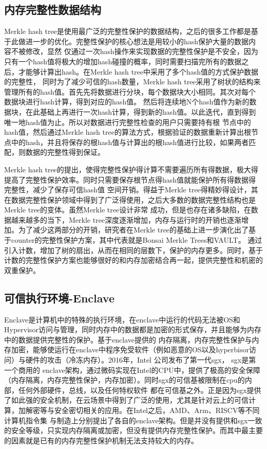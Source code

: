 \subsection{内存完整性数据结构}
Merkle hash tree是使用最广泛的完整性保护的数据结构，之后的很多工作都是基于此做进一步的优化。完整性保护的核心想法是用较小的hash保护大量的数据内容不被修改，显然
仅通过一次hash操作来实现数据的完整性保护是不安全，因为只有一个hash值将极大的增加hash碰撞的概率，同时需要扫描完所有的数据之后，才能够计算出hash。在Merkle hash tree中采用了多个hash值的方式保护数据的完整性，
同时为了减少可信的hash数量，Merkle hash tree采用了树状的结构来管理所有的hash值。首先先将数据进行分块，每个数据块大小相同。其次对每个数据块进行hash计算，得到对应的hash值。
然后将连续地N个hash值作为新的数据块，在此基础上再进行一次hash计算，得到新的hash值。以此迭代，直到得到唯一地hash值为止。所以对数据进行完整性检查的用户只需要持有根
节点中的hash值，然后通过Merkle hash tree的算法方式，根据验证的数据重新计算出根节点中的hash，并且将保存的根hash值与计算出的根hash值进行比较，如果两者匹配，则数据的完整性得到保证。

Merkle hash tree的提出，使得完整性保护得计算不需要遍历所有得数据，极大得提高了完整性保护效率。同时只需要保存根节点得hash值就能保护所有得数据得完整性，减少了保存可信hash值
空间开销。得益于Merkle tree得精妙得设计，其在数据完整性保护领域中得到了广泛得使用，之后大多数的数据完整性结构也是Merkle tree的变体。虽然Merkle tree设计非常
成功，但是也存在诸多缺陷，在数据越来越多的当下，Merkle tree深度逐渐增加，内存与运行时的开销也逐渐增加。为了减少这两部分的开销，研究者在Merkle tree的基础上进一步演化出了基于counter的完整性保护方案，其中代表就是Bonsai Merkle Trees和VAULT。
通过引入计数，增加了树的扇出，从而在相同的层数下，保护的内存更多。同时，基于计数的完整性保护方案也能够很好的和内存加密结合再一起，提供完整性和机密的双重保护。

\subsection{可信执行环境-Enclave}
Enclave是计算机中的特殊的执行环境，在enclave中运行的代码无法被OS和Hypervisor访问与管理，同时内存中的数据都是加密的形式保存，并且能够为内存中的数据提供完整性的保护。基于enclave提供的
内存隔离，内存完整性保护与内存加密，能够使运行在enclave中程序免受软件（例如恶意的OS以及hyperbisor访问）与硬件的攻击（冷冻内存）。2016年，Intel 公司发布了第一代sgx， sgx是第一个商用的
enclave架构，通过微码实现在Intel的CPU中，提供了极高的安全保障（内存隔离，内存完整性保护，内存加密）。同时sgx的可信基被限制在cpu的内部，任何外部硬件，总线，以及任何特权软件
都在可信基之外。正是因为sgx提供了如此强的安全机制，在云场景中得到了广泛的使用，尤其是针对云上的可信计算，加解密等与安全密切相关的应用。在Intel之后，AMD、Arm、RISCV等不同计算机指令集
与制造上分别提出了各自的enclave架构。但是并没有提供和sgx一致的安全等级，只实现内存隔离或加密，但没有提供内存完整性保护。而其中最主要的因素就是已有的内存完整性保护机制无法支持较大的内存。

